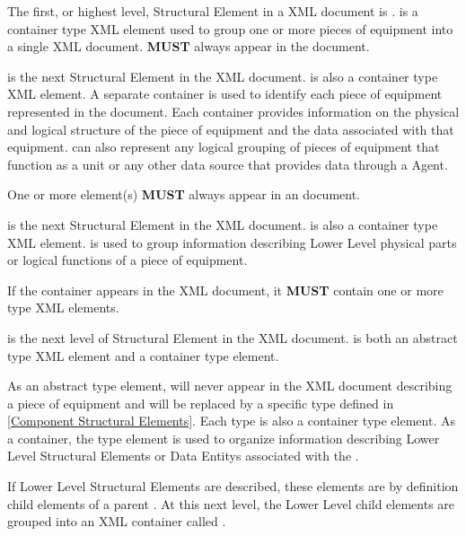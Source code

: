 The first, or highest level, \gls{Structural Element} in a  \gls{XML} document is .  is a container type \gls{XML} element used to group one or more pieces of equipment into a single \gls{XML} document.   \textbf{MUST} always appear in the  document.

 is the next \gls{Structural Element} in the  \gls{XML} document.  is also a container type \gls{XML} element. A separate  container is used to identify each piece of equipment represented in the  document. Each  container provides information on the physical and logical structure of the piece of equipment and the data associated with that equipment.  can also represent any logical grouping of pieces of equipment that function as a unit or any other data source that provides data through a \gls{Agent}.

One or more  element(s) \textbf{MUST} always appear in an  document.

 is the next \gls{Structural Element} in the  \gls{XML} document.  is also a container type XML element.  is used to group information describing \gls{Lower Level} physical parts or logical functions of a piece of equipment.

If the  container appears in the XML document, it \textbf{MUST} contain one or more  type XML elements.

 is the next level of \gls{Structural Element} in the  \gls{XML} document.  is both an abstract type \gls{XML} element and a container type element. 

As an abstract type element,  will never appear in the \gls{XML} document describing a piece of equipment and will be replaced by a specific  type defined in \ref{Component Structural Elements}. Each  type is also a container type element. As a container, the  type element is used to organize information describing \gls{Lower Level} \glspl{Structural Element} or \glspl{Data Entity} associated with the .

If \gls{Lower Level} \glspl{Structural Element} are described, these elements are by definition child  elements of a parent . At this next level, the \gls{Lower Level} child  elements are grouped into an \gls{XML} container called .
 
